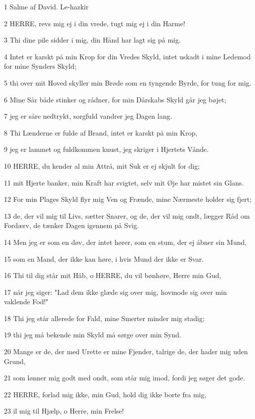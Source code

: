 \par 1 Salme af David. Le-hazkir
\par 2 HERRE, revs mig ej i din vrede, tugt mig ej i din Harme!
\par 3 Thi dine pile sidder i mig, din Hånd har lagt sig på mig.
\par 4 Intet er karskt på min Krop for din Vredes Skyld, intet uskadt i mine Ledemod for mine Synders Skyld;
\par 5 thi over mit Hoved skyller min Brøde som en tyngende Byrde, for tung for mig.
\par 6 Mine Sår både stinker og rådner, for min Dårskabs Skyld går jeg bøjet;
\par 7 jeg er såre nedtrykt, sorgfuld vandrer jeg Dagen lang.
\par 8 Thi Lænderne er fulde af Brand, intet er karskt på min Krop,
\par 9 jeg er lammet og fuldkommen knust, jeg skriger i Hjertets Vånde.
\par 10 HERRE, du kender al min Attrå, mit Suk er ej skjult for dig;
\par 11 mit Hjerte banker, min Kraft har svigtet, selv mit Øje har mistet sin Glans.
\par 12 For min Plages Skyld flyr mig Ven og Frænde, mine Nærmeste holder sig fjert;
\par 13 de, der vil mig til Livs, sætter Snarer, og de, der vil mig ondt, lægger Råd om Fordærv, de tænker Dagen igennem på Svig.
\par 14 Men jeg er som en døv, der intet hører, som en stum, der ej åbner sin Mund,
\par 15 som en Mand, der ikke kan høre, i hvis Mund der ikke er Svar.
\par 16 Thi til dig står mit Håb, o HERRE, du vil bønhøre, Herre min Gud,
\par 17 når jeg siger: "Lad dem ikke glæde sig over mig, hovmode sig over min vaklende Fod!"
\par 18 Thi jeg står allerede for Fald, mine Smerter minder mig stadig;
\par 19 thi jeg må bekende min Skyld må sørge over min Synd.
\par 20 Mange er de, der med Urette er mine Fjender, talrige de, der hader mig uden Grund,
\par 21 som lønner mig godt med ondt, som står mig imod, fordi jeg søger det gode.
\par 22 HERRE, forlad mig ikke, min Gud, hold dig ikke borte fra mig,
\par 23 il mig til Hjælp, o Herre, min Frelse!

